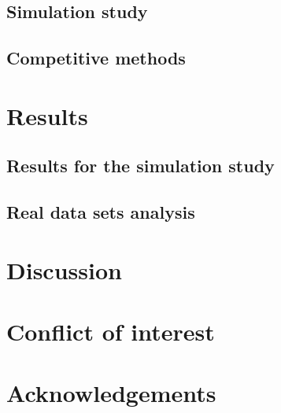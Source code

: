 \documentclass[11pt]{article}
\theoremstyle{plain}
\theoremstyle{definition}
\theoremstyle{remark}
\begin{document}
\subsection{Simulation study}



\subsection{Competitive methods}


\section{Results}

\subsection{Results for the simulation study}


\subsection{Real data sets analysis}


\section{Discussion}



\section{Conflict of interest}

\section{Acknowledgements}

\begin{thebibliography}{99}


\end{thebibliography}
\end{document}
